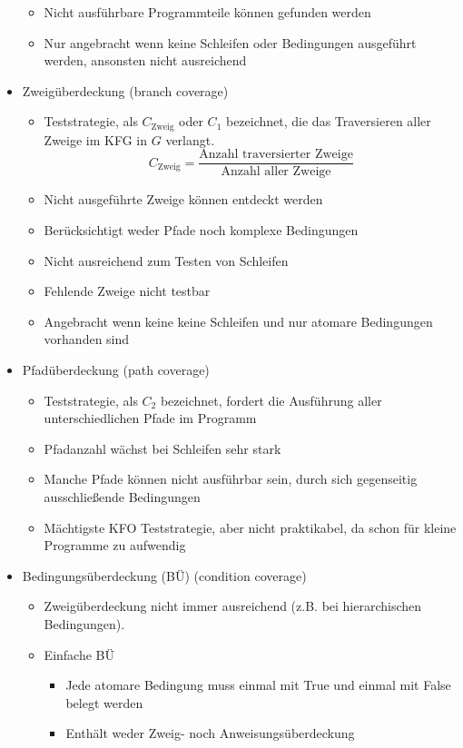 \documentclass{article}
\begin{document}
\begin{itemize}
\begin{itemize}
\[    \]
    \item Nicht ausführbare Programmteile können gefunden werden
    \item Nur angebracht wenn keine Schleifen oder Bedingungen ausgeführt werden, ansonsten nicht ausreichend
  \end{itemize}
  \item Zweigüberdeckung (branch coverage)
  \begin{itemize}
    \item Teststrategie, als $C_{\text{Zweig}}$ oder $C_1$ bezeichnet, die das Traversieren aller Zweige im KFG in $G$ verlangt.
    \[
    C_{\text{Zweig}}=\frac{\text{Anzahl traversierter Zweige}}{\text{Anzahl aller Zweige}}
    \]
    \item Nicht ausgeführte Zweige können entdeckt werden
    \item Berücksichtigt weder Pfade noch komplexe Bedingungen
    \item Nicht ausreichend zum Testen von Schleifen
    \item Fehlende Zweige nicht testbar
    \item Angebracht wenn keine keine Schleifen und nur atomare Bedingungen vorhanden sind
  \end{itemize}
  \item Pfadüberdeckung (path coverage)
  \begin{itemize}
    \item Teststrategie, als $C_2$ bezeichnet, fordert die Ausführung aller unterschiedlichen Pfade im Programm
    \item Pfadanzahl wächst bei Schleifen sehr stark
    \item Manche Pfade können nicht ausführbar sein, durch sich gegenseitig ausschließende Bedingungen
    \item Mächtigste KFO Teststrategie, aber nicht praktikabel, da schon für kleine Programme zu aufwendig
  \end{itemize}
  \item Bedingungsüberdeckung (BÜ) (condition coverage)
  \begin{itemize}
    \item Zweigüberdeckung nicht immer ausreichend (z.B. bei hierarchischen Bedingungen).
    \item Einfache BÜ
    \begin{itemize}
      \item Jede atomare Bedingung muss einmal mit True und einmal mit False belegt werden
      \item Enthält weder Zweig- noch Anweisungsüberdeckung

\end{itemize}
\end{itemize}
\end{itemize}
\end{document}
